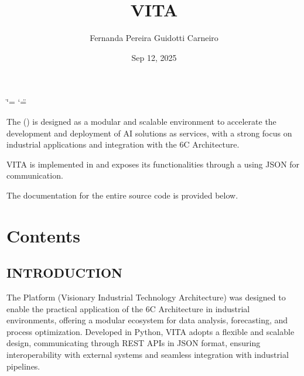 \documentclass[letterpaper,10pt,english]{sphinxmanual}
\title{VITA}
\date{Sep 12, 2025}
\author{Fernanda Pereira Guidotti Carneiro}
\begin{document}
\ifdefined\shorthandoff
  \ifnum\catcode`\=\string=\active\shorthandoff{=}\fi
  \ifnum\catcode`\"=\active{}\fi
\fi

\pagestyle{empty}
\sphinxmaketitle
\pagestyle{plain}
\sphinxtableofcontents
\pagestyle{normal}
\label{\detokenize{index::doc}}


\sphinxAtStartPar
The  () is designed as a modular and scalable environment to accelerate the development and deployment of AI solutions as services, with a strong focus on industrial applications and integration with the 6C Architecture.

\sphinxAtStartPar
VITA is implemented in  and exposes its functionalities through a  using JSON for communication.

\sphinxAtStartPar
The documentation for the entire source code is provided below.


\chapter{Contents}
\label{\detokenize{index:contents}}
\sphinxstepscope


\section{INTRODUCTION}
\label{\detokenize{introduction:introduction}}\label{\detokenize{introduction::doc}}
\sphinxAtStartPar
The  Platform (Visionary Industrial Technology Architecture) was designed to enable the practical application of the 6C Architecture in industrial environments, offering a modular ecosystem for data analysis, forecasting, and process optimization.
Developed in Python, VITA adopts a flexible and scalable design, communicating through REST APIs in JSON format, ensuring interoperability with external systems and seamless integration with industrial pipelines.
\end{document}
